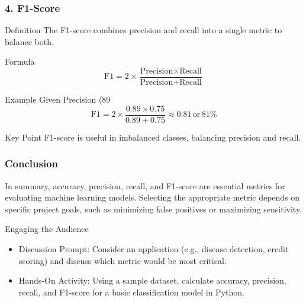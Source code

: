 \documentclass[aspectratio=169]{beamer}
\begin{document}
\begin{frame}[fragile]
    \frametitle{4. F1-Score}
    \begin{block}{Definition}
        The F1-score combines precision and recall into a single metric to balance both.
    \end{block}

    \begin{block}{Formula}
        \begin{equation}
        \text{F1} = 2 \times \frac{\text{Precision} \times \text{Recall}}{\text{Precision} + \text{Recall}}
        \end{equation}
    \end{block}

    \begin{block}{Example}
        Given Precision (89%
        \begin{equation}
        \text{F1} = 2 \times \frac{0.89 \times 0.75}{0.89 + 0.75} \approx 0.81 \, \text{or} \, 81\%
        \end{equation}
    \end{block}

    \begin{block}{Key Point}
        F1-score is useful in imbalanced classes, balancing precision and recall.
    \end{block}
\end{frame}

\begin{frame}[fragile]
    \frametitle{Conclusion}
    In summary, accuracy, precision, recall, and F1-score are essential metrics for evaluating machine learning models. Selecting the appropriate metric depends on specific project goals, such as minimizing false positives or maximizing sensitivity. 

    \begin{block}{Engaging the Audience}
        \begin{itemize}
            \item Discussion Prompt: Consider an application (e.g., disease detection, credit scoring) and discuss which metric would be most critical.
            \item Hands-On Activity: Using a sample dataset, calculate accuracy, precision, recall, and F1-score for a basic classification model in Python.
        \end{itemize}
    \end{block}
\end{frame}
\end{document}
